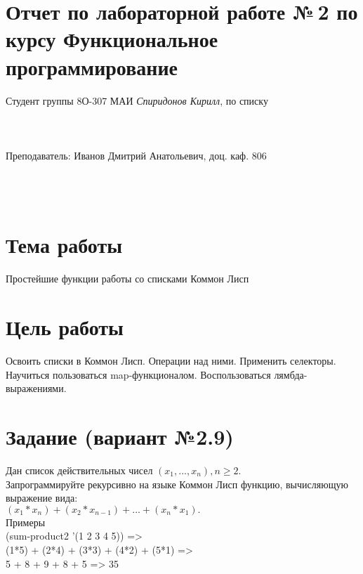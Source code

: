 \documentclass[12pt]{article}
\begin{document}
\section*{Отчет по лабораторной работе №\,2
по курсу \guillemotleft  Функциональное программирование\guillemotright}
\begin{flushright}
Студент группы 8О-307 МАИ \textit{Спиридонов Кирилл},  по списку \\
 \\
 \\
\ \\
Преподаватель: Иванов Дмитрий Анатольевич, доц. каф. 806 \\
 \\
 \\
 \\

\end{flushright}

\section{Тема работы}
{\large Простейшие функции работы со списками Коммон Лисп \par}

\section{Цель работы}
{\large Освоить списки в Коммон Лисп. Операции над ними. Применить селекторы.
	Научиться пользоваться map-функционалом. Воспользоваться лямбда-выражениями.\par}

\section{Задание (вариант №2.9)}
{\large 
	Дан список действительных чисел $(x_1,...,x_n), n\ge2.$ \\
	Запрограммируйте рекурсивно на языке Коммон Лисп функцию, вычисляющую выражение вида: \\
	$(x_1 * x_n) + (x_2 * x_{n-1})+...+(x_n * x_1).$ \\

Примеры \\
(sum-product2 '(1 2 3 4 5)) => \\
 (1*5) + (2*4) + (3*3) + (4*2) + (5*1) => \\
 5 + 8 + 9 + 8 + 5 => 35 \\
}
\end{document}
